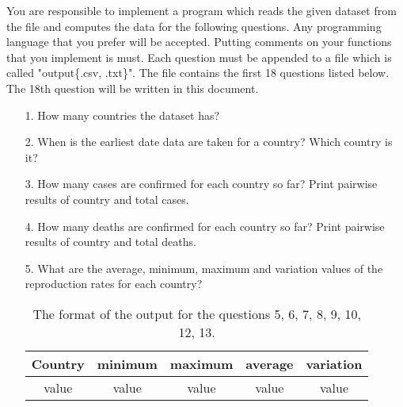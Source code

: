 \documentclass[a4 paper]{article}
\numberwithin{equation}{section}
\newcommand{\0}{\mathbf{0}}
\begin{document}
You are responsible to implement a program which reads the given dataset from the file and computes the data for the following questions. Any programming language that you prefer will be accepted. Putting comments on your functions that you implement is must. Each question must be appended to a file which is called "output\{.csv, .txt\}". The file contains the first 18 questions listed below. The 18th question will be written in this document.

\begin{itemize}
	\item[1. ] How many countries the dataset has?
	\item[2. ] When is the earliest date data are taken for a country? Which country is it?
	\item[3. ] How many cases are confirmed for each country so far? Print pairwise results of country and total cases.
	\item[4. ] How many deaths are confirmed for each country so far? Print pairwise results of country and total deaths.
	\item[5. ] What are the average, minimum, maximum and variation values of the reproduction rates for each country?
	\begin{table}[ht]
		\caption{The format of the output for the questions 5, 6, 7, 8, 9, 10, 12, 13.} %
		\centering  %
		\begin{tabular}{c c c c c}%
			\hline\hline       %
			Country & minimum & maximum & average & variation \\ 
			[0.5ex]%
			\hline      %
			value & value & value & value & value \\%
			

\end{tabular}
\end{table}
\end{itemize}
\end{document}
